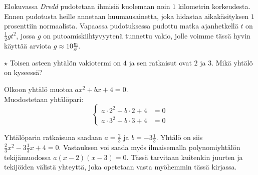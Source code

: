 \begin{tehtavasivu}
\begin{tehtava}
    Elokuvassa \emph{Dredd} pudotetaan ihmisiä kuolemaan noin $1$ kilometrin korkeudesta. Ennen pudotusta heille annetaan huumausainetta, joka hidastaa aikakäsityksen $1$ prosenttiin normaalista. Vapaassa pudotuksessa pudottu matka ajanhetkellä $t$ on $\frac{1}{2} gt^2$, jossa $g$ on putoamiskiihtyvyytenä tunnettu vakio, jolle voimme tässä hyvin käyttää arviota $g \approx 10\frac{\text{m}}{\text{s}^2}$.
    \begin{vastaus}
    \end{vastaus}
\end{tehtava}

\begin{tehtava}
$\star$ Toisen asteen yhtälön vakiotermi on $4$ ja sen ratkaisut ovat $2$ ja $3$. Mikä yhtälö on kyseessä?
    \begin{vastaus}
		Olkoon yhtälö muotoa $ax^2+bx+4=0$. \\      
      Muodostetaan yhtälöpari:
      \[
        \left\{
          \begin{aligned}
            a\cdot 2^2 + b\cdot 2 + 4 &= 0 \\
            a\cdot 3^2 + b\cdot 3 + 4 &= 0
          \end{aligned}
        \right.
      \]
      
      Yhtälöparin ratkaisuna saadaan $a=\frac23$ ja $b=-3\frac13$. Yhtälö on siis $\frac{2}{3}x^2-3\frac{1}{3}x+4=0$. Vastauksen voi saada myös ilmaisemalla polynomiyhtälön tekijämuodossa $a(x-2)(x-3)=0$. Tässä tarvitaan kuitenkin juurten ja tekijöiden välistä yhteyttä, joka opetetaan vasta myöhemmin tässä kirjassa.
    \end{vastaus}
\end{tehtava}


\end{tehtavasivu}
